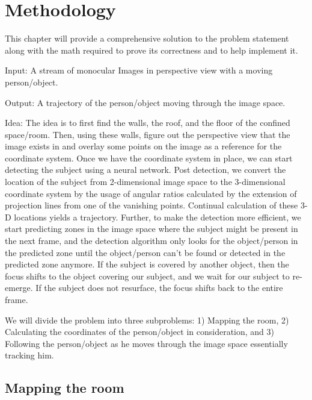\chapter{Methodology}

This chapter will provide a comprehensive solution to the problem statement along with the math required to prove its correctness and to help implement it.\newline

Input: A stream of monocular Images in perspective view with a moving person/object.\newline

Output: A trajectory of the person/object moving through the image space.\newline

Idea: The idea is to first find the walls, the roof, and the floor of the confined space/room. Then, using these walls, figure out the perspective view that the image exists in and overlay some points on the image as a reference for the coordinate system. Once we have the coordinate system in place, we can start detecting the subject using a neural network. Post detection, we convert the location of the subject from 2-dimensional image space to the 3-dimensional coordinate system by the usage of angular ratios calculated by the extension of projection lines from one of the vanishing points. Continual calculation of these 3-D locations yields a trajectory. Further, to make the detection more efficient, we start predicting zones in the image space where the subject might be present in the next frame, and the detection algorithm only looks for the object/person in the predicted zone until the object/person can’t be found or detected in the predicted zone anymore. If the subject is covered by another object, then the focus shifts to the object covering our subject, and we wait for our subject to re-emerge. If the subject does not resurface, the focus shifts back to the entire frame.\newline

We will divide the problem into three subproblems: 1) Mapping the room, 2) Calculating the coordinates of the person/object in consideration, and 3) Following the person/object as he moves through the image space essentially tracking him.\newline

\section{Mapping the room}

